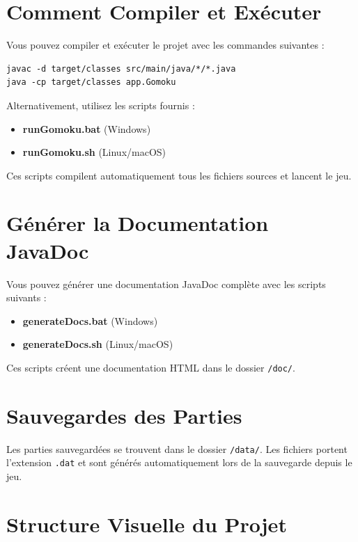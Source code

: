 \documentclass[a4paper,11pt]{article}
\begin{document}
\section{Comment Compiler et Exécuter}

Vous pouvez compiler et exécuter le projet avec les commandes suivantes :

\begin{lstlisting}
javac -d target/classes src/main/java/*/*.java
java -cp target/classes app.Gomoku
\end{lstlisting}

Alternativement, utilisez les scripts fournis :

\begin{itemize}
    \item \textbf{runGomoku.bat} (Windows)
    \item \textbf{runGomoku.sh} (Linux/macOS)
\end{itemize}

Ces scripts compilent automatiquement tous les fichiers sources et lancent le jeu.

\section{Générer la Documentation JavaDoc}

Vous pouvez générer une documentation JavaDoc complète avec les scripts suivants :

\begin{itemize}
    \item \textbf{generateDocs.bat} (Windows)
    \item \textbf{generateDocs.sh} (Linux/macOS)
\end{itemize}

Ces scripts créent une documentation HTML dans le dossier \texttt{/doc/}.

\section{Sauvegardes des Parties}

Les parties sauvegardées se trouvent dans le dossier \texttt{/data/}. Les fichiers portent l'extension \texttt{.dat} et sont générés automatiquement lors de la sauvegarde depuis le jeu.

\vspace{15mm}
\section{Structure Visuelle du Projet}
\end{document}
